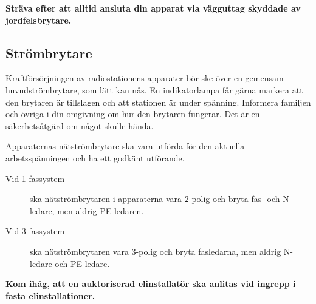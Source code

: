 \noindent\textbf{Sträva efter att alltid ansluta din apparat via vägguttag
	skyddade av jordfelsbrytare.}

\subsection{Strömbrytare}

Kraftförsörjningen av radiostationens apparater bör ske över en
gemensam huvudströmbrytare, som lätt kan nås.
En indikatorlampa får gärna markera att den brytaren är tillslagen och att
stationen är under spänning.
Informera familjen och övriga i din omgivning om hur den brytaren fungerar.
Det är en säkerhetsåtgärd om något skulle hända.

Apparaternas nätströmbrytare ska vara utförda för den aktuella arbetsspänningen
och ha ett godkänt utförande.

\begin{description}
\item[Vid 1-fassystem] ska nätströmbrytaren i apparaterna vara 2-polig och bryta fas-
och N-ledare, men aldrig PE-ledaren.

\item[Vid 3-fassystem] ska nätströmbrytaren vara 3-polig och bryta fasledarna, men
aldrig N-ledare och PE-ledare.
\end{description}

\noindent\textbf{Kom ihåg, att en auktoriserad elinstallatör ska
  anlitas vid ingrepp i fasta elinstallationer.}

